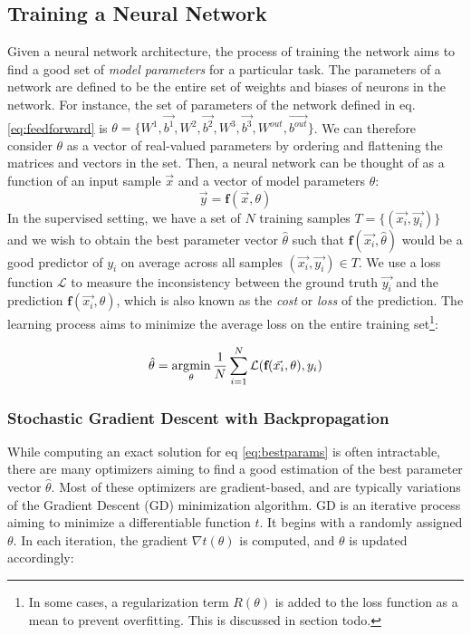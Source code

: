 \subsection{Training a Neural Network}
Given a neural network architecture, the process of training the network aims to find a good set of \emph{model parameters} for a particular task. The parameters of a network are defined to be the entire set of weights and biases of neurons in the network. For instance, the set of parameters of the network defined in eq. \ref{eq:feedforward} is $\theta = \{W^1, \vec{b^1}, W^2, \vec{b^2}, W^3, \vec{b^3}, W^{out}, \vec{b^{out}}\}$. We can therefore consider $\theta$ as a vector of real-valued parameters by ordering and flattening the matrices and vectors in the set. Then, a neural network can be thought of as a function of an input sample $\vec{x}$ and a vector of model parameters $\theta$: 
$$ \vec{y} = \textbf{f}(\vec{x}, \theta) $$ 
In the supervised setting, we have a set of $N$ training samples $T = \{(\vec{x_i}, \vec{y_i})\}$ and we wish to obtain the best parameter vector $\hat{\theta}$ such that $\textbf{f}(\vec{x_i}, \hat{\theta})$ would be a good predictor of $y_i$ on average across all samples $(\vec{x_i}, \vec{y_i}) \in T$.  We use a loss function $\mathcal{L}$ to measure the inconsistency between the ground truth $\vec{y_i}$ and the prediction $\textbf{f}(\vec{x_i}, \theta)$, which is also known as the \emph{cost} or \emph{loss} of the prediction. The learning process aims to minimize the average loss on the entire training set\footnote{In some cases, a regularization term $R(\theta)$ is added to the loss function as a mean to prevent overfitting. This is discussed in section todo.}:

\begin{equation}
\hat{\theta} = \operatorname*{\arg\!\min}_{\theta} \frac{1}{N}\sum_{i=1}^N \mathcal{L}(\textbf{f}(\vec{x_i}, \theta), y_i)
\label{eq:bestparams}    
\end{equation}

\subsubsection{Stochastic Gradient Descent with Backpropagation}
While computing an exact solution for eq \ref{eq:bestparams} is often intractable, there are many optimizers aiming to find a good estimation of the best parameter vector $\hat{\theta}$. Most of these optimizers are gradient-based, and are typically variations of the Gradient Descent (GD) minimization algorithm. GD is an iterative process aiming to minimize a differentiable function $t$. It begins with a randomly assigned $\theta$. In each iteration, the gradient $\nabla t(\theta)$ is computed, and $\theta$ is updated accordingly:


